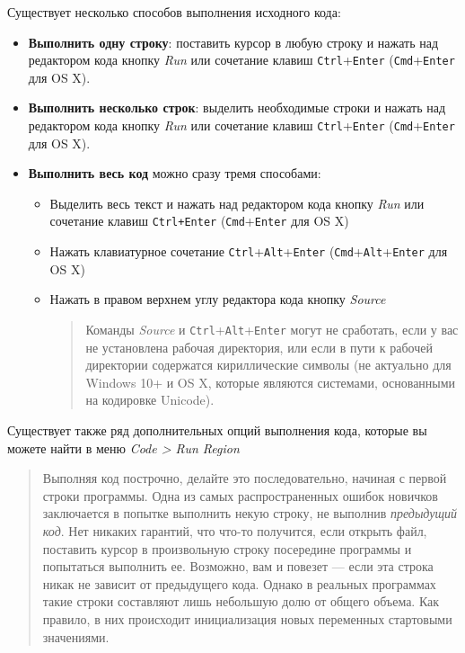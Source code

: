 \documentclass[]{book}
\providecommand{\tightlist}{%
  \setlength{\itemsep}{0pt}\setlength{\parskip}{0pt}}
\begin{document}
Существует несколько способов выполнения исходного кода:

\begin{itemize}
\tightlist
\item
  \textbf{Выполнить одну строку}: поставить курсор в любую строку и
  нажать над редактором кода кнопку \emph{Run} или сочетание клавиш
  \texttt{Ctrl}+\texttt{Enter} (\texttt{Cmd}+\texttt{Enter} для OS X).
\item
  \textbf{Выполнить несколько строк}: выделить необходимые строки и
  нажать над редактором кода кнопку \emph{Run} или сочетание клавиш
  \texttt{Ctrl}+\texttt{Enter} (\texttt{Cmd}+\texttt{Enter} для OS X).
\item
  \textbf{Выполнить весь код} можно сразу тремя способами:

  \begin{itemize}
  \item
    Выделить весь текст и нажать над редактором кода кнопку \emph{Run}
    или сочетание клавиш \texttt{Ctrl+Enter}
    (\texttt{Cmd}+\texttt{Enter} для OS X)
  \item
    Нажать клавиатурное сочетание
    \texttt{Ctrl}+\texttt{Alt}+\texttt{Enter}
    (\texttt{Cmd}+\texttt{Alt}+\texttt{Enter} для OS X)
  \item
    Нажать в правом верхнем углу редактора кода кнопку \emph{Source}

    \begin{quote}
    Команды \emph{Source} и \texttt{Ctrl}+\texttt{Alt}+\texttt{Enter}
    могут не сработать, если у вас не установлена рабочая директория,
    или если в пути к рабочей директории содержатся кириллические
    символы (не актуально для Windows 10+ и OS X, которые являются
    системами, основанными на кодировке Unicode).
    \end{quote}
  \end{itemize}
\end{itemize}

Существует также ряд дополнительных опций выполнения кода, которые вы
можете найти в меню \emph{Code \textgreater{} Run Region}

\begin{quote}
Выполняя код построчно, делайте это последовательно, начиная с первой
строки программы. Одна из самых распространенных ошибок новичков
заключается в попытке выполнить некую строку, не выполнив
\emph{предыдущий код}. Нет никаких гарантий, что что-то получится, если
открыть файл, поставить курсор в произвольную строку посередине
программы и попытаться выполнить ее. Возможно, вам и повезет --- если
эта строка никак не зависит от предыдущего кода. Однако в реальных
программах такие строки составляют лишь небольшую долю от общего объема.
Как правило, в них происходит инициализация новых переменных стартовыми
значениями.
\end{quote}
\end{document}
